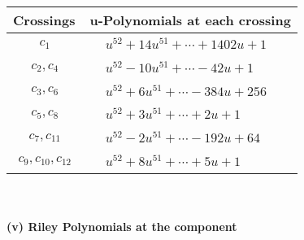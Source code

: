 \documentclass[1p]{elsarticle_modified}
\theoremstyle{definition}
\begin{document}
\begin{tabular}{m{50pt}|m{274pt}}
Crossings & \hspace{64pt}u-Polynomials at each crossing \\
\hline $$\begin{aligned}c_{1}\end{aligned}$$&$\begin{aligned}
&u^{52}+14 u^{51}+\cdots+1402 u+1
\end{aligned}$\\
\hline $$\begin{aligned}c_{2},c_{4}\end{aligned}$$&$\begin{aligned}
&u^{52}-10 u^{51}+\cdots-42 u+1
\end{aligned}$\\
\hline $$\begin{aligned}c_{3},c_{6}\end{aligned}$$&$\begin{aligned}
&u^{52}+6 u^{51}+\cdots-384 u+256
\end{aligned}$\\
\hline $$\begin{aligned}c_{5},c_{8}\end{aligned}$$&$\begin{aligned}
&u^{52}+3 u^{51}+\cdots+2 u+1
\end{aligned}$\\
\hline $$\begin{aligned}c_{7},c_{11}\end{aligned}$$&$\begin{aligned}
&u^{52}-2 u^{51}+\cdots-192 u+64
\end{aligned}$\\
\hline $$\begin{aligned}c_{9},c_{10},c_{12}\end{aligned}$$&$\begin{aligned}
&u^{52}+8 u^{51}+\cdots+5 u+1
\end{aligned}$\\
\hline
\end{tabular}\\~\\
\newpage\renewcommand{\arraystretch}{1}
\flushleft \textbf{(v) Riley Polynomials at the component}\newline \\
\end{document}
